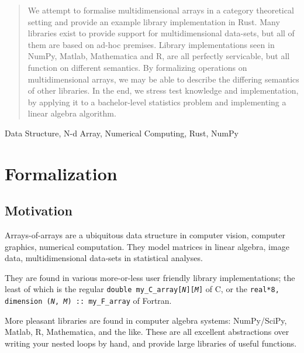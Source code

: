 \documentclass{DIKU-report}
\begin{document}
\maketitle

\begin{abstract}
  We attempt to formalise multidimensional arrays in a category theoretical
  setting and provide an example library implementation in Rust.
  Many libraries exist to provide support for multidimensional data-sets, but all
  of them are based on ad-hoc premises.
  Library implementations seen in NumPy, Matlab, Mathematica and R, are all
  perfectly servicable, but all function on different semantics.
  By formalizing operations on multidimensional arrays, we may be able to
  describe the differing semantics of other libraries.
  In the end, we stress test knowledge and implementation, by applying it to
  a bachelor-level statistics problem and implementing a linear algebra algorithm.
\end{abstract}

\begin{keywords}
  Data Structure, N-d Array, Numerical Computing, Rust, NumPy
\end{keywords}

\setcounter{tocdepth}{2}
\tableofcontents

\chapter{Formalization}

\section{Motivation}

Arrays-of-arrays are a ubiquitous data structure in computer vision,
computer graphics, numerical computation. They model matrices in linear algebra,
image data, multidimensional data-sets in statistical analyses.

They are found in various more-or-less user friendly library implementations;
the least of which is the regular \texttt{double my\_C\_array[\textit{N}][\textit{M}]} of
C, or the \texttt{real*8, dimension (\textit{N}, \textit{M}) :: my\_F\_array} of Fortran.

More pleasant libraries are found in computer algebra systems: NumPy/SciPy, Matlab,
R, Mathematica, and the like. These are all excellent abstractions over
writing your nested loops by hand, and provide large libraries of useful functions.
\end{document}
